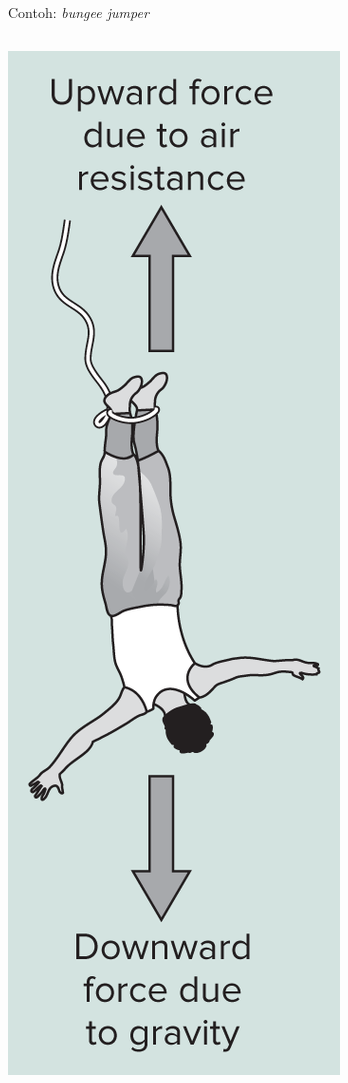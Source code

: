 

\begin{frame}{Contoh: \emph{bungee jumper}}

\fontsize{9pt}{10pt}\selectfont

\begin{columns}

\begin{column}{0.2\textwidth}

\includegraphics[height=0.7\textheight]{../chapra_python/Chapra_Fig_1_1.png}


\end{column}
\end{columns}
\end{frame}
